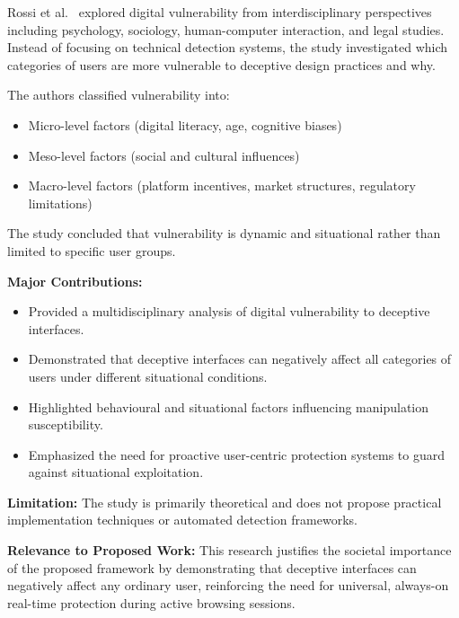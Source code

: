 Rossi et al.~\cite{rossi2024} explored digital vulnerability from interdisciplinary perspectives including psychology, sociology, human-computer interaction, and legal studies. Instead of focusing on technical detection systems, the study investigated which categories of users are more vulnerable to deceptive design practices and why.

The authors classified vulnerability into:
\begin{itemize}
\item Micro-level factors (digital literacy, age, cognitive biases)
\item Meso-level factors (social and cultural influences)
\item Macro-level factors (platform incentives, market structures, regulatory limitations)
\end{itemize}

The study concluded that vulnerability is dynamic and situational rather than limited to specific user groups.

\vspace{0.3cm}

\textbf{Major Contributions:}
\begin{itemize}
\item Provided a multidisciplinary analysis of digital vulnerability to deceptive interfaces.
\item Demonstrated that deceptive interfaces can negatively affect all categories of users under different situational conditions.
\item Highlighted behavioural and situational factors influencing manipulation susceptibility.
\item Emphasized the need for proactive user-centric protection systems to guard against situational exploitation.
\end{itemize}

\vspace{0.3cm}

\textbf{Limitation:}
The study is primarily theoretical and does not propose practical implementation techniques or automated detection frameworks.

\vspace{0.3cm}

\textbf{Relevance to Proposed Work:}
This research justifies the societal importance of the proposed framework by demonstrating that deceptive interfaces can negatively affect any ordinary user, reinforcing the need for universal, always-on real-time protection during active browsing sessions.

